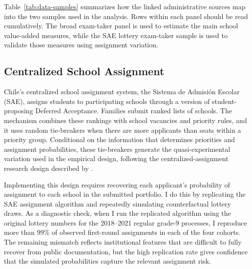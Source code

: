 \documentclass[a4paper, article, english, oneside, unknownkeysallowed, 12pt]{memoir}
\begin{document}
Table~\ref{tab:data-samples} summarizes how the linked administrative sources map into the two samples used in the analysis.
Rows within each panel should be read cumulatively.
The broad exam-taker panel is used to estimate the main school value-added measures, while the SAE lottery exam-taker sample is used to validate those measures using assignment variation.

\subsection{Centralized School Assignment}

Chile's centralized school assignment system, the Sistema de Admisi\'on Escolar (SAE), assigns students to participating schools through a version of student-proposing Deferred Acceptance.
Families submit ranked lists of schools.
The mechanism combines these rankings with school vacancies and priority rules, and it uses random tie-breakers when there are more applicants than seats within a priority group.
Conditional on the information that determines priorities and assignment probabilities, these tie-breakers generate the quasi-experimental variation used in the empirical design, following the centralized-assignment research design described by \textcite{abdulkadiroglu_research_2017}.

Implementing this design requires recovering each applicant's probability of assignment to each school in the submitted portfolio.
I do this by replicating the SAE assignment algorithm and repeatedly simulating counterfactual lottery draws.
As a diagnostic check, when I run the replicated algorithm using the original lottery numbers for the 2018--2021 regular grade-9 processes, I reproduce more than 99\% of observed first-round assignments in each of the four cohorts.
The remaining mismatch reflects institutional features that are difficult to fully recover from public documentation, but the high replication rate gives confidence that the simulated probabilities capture the relevant assignment risk.
\end{document}
